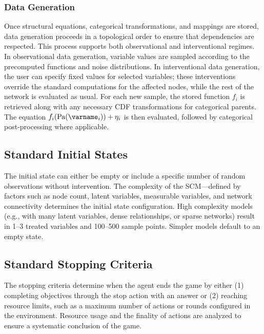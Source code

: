 \documentclass{article}
\begin{document}
        \subsubsection{Data Generation}
            Once structural equations, categorical transformations, and mappings are stored, data generation proceeds in a topological order to ensure that dependencies are respected. 
            This process supports both observational and interventional regimes. 
            In observational data generation, variable values are sampled according to the precomputed functions and noise distributions. 
            In interventional data generation, the user can specify fixed values for selected variables; these interventions override the standard computations for the affected nodes, while the rest of the network is evaluated as usual. 
            For each new sample, the stored function $ f_i $ is retrieved along with any necessary CDF transformations for categorical parents. 
            The equation \( f_i(\text{Pa}(\varname_i)) + \eta_i \) is then evaluated, followed by categorical post-processing where applicable.



    \subsection{Standard Initial States}
        The initial state can either be empty or include a specific number of random observations without intervention. 
        The complexity of the SCM—defined by factors such as node count, latent variables, measurable variables, and network connectivity determines the initial state configuration. 
        High complexity models (e.g., with many latent variables, dense relationships, or sparse networks) result in 1–3 treated variables and 100–500 sample points. 
        Simpler models default to an empty state.



    \subsection{Standard Stopping Criteria}
        The stopping criteria determine when the agent ends the game by either (1) completing objectives through the stop action with an answer or (2) reaching resource limits, such as a maximum number of actions or rounds configured in the environment. 
        Resource usage and the finality of actions are analyzed to ensure a systematic conclusion of the game.
\end{document}
